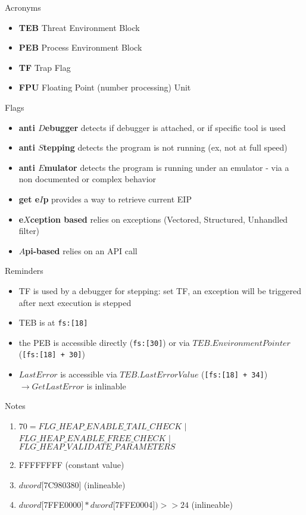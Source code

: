 \sig

\newpage
{\large Acronyms}
\begin{itemize}
\item {\bf TEB}
Threat Environment Block
\item {\bf PEB}
Process Environment Block
\item {\bf TF}
Trap Flag
\item {\bf FPU}
Floating Point (number processing) Unit
\end{itemize}

{\large Flags}
\begin{itemize}
\item {\bf anti $D$ebugger}
detects if debugger is attached, or if specific tool is used
\item {\bf anti $S$tepping}
detects the program is not running (ex, not at full speed)
\item {\bf anti $E$mulator}
detects the program is running under an emulator - via a non documented or complex behavior
\item {\bf get e$I$p}
provides a way to retrieve current EIP
\item {\bf e$X$ception based}
relies on exceptions (Vectored, Structured, Unhandled filter)
\item {\bf $A$pi-based}
relies on an API call
\end{itemize}


{\large Reminders}
\begin{itemize}
\item
TF is used by a debugger for stepping: set TF, an exception will be triggered after next execution is stepped
\item
TEB is at {\tt fs:[18]}
\item
the PEB is accessible directly ({\tt fs:[30]}) or via $TEB.EnvironmentPointer$ ({\tt [fs:[18] + 30]})
\item
$LastError$ is accessible via $TEB.LastErrorValue$ ({\tt [fs:[18] + 34]}) $\rightarrow GetLastError$ is inlinable
\end{itemize}

{\large Notes}
\begin{enumerate}
\item
$70 = ${\footnotesize $FLG\_HEAP\_ENABLE\_TAIL\_CHECK$} $|$ {\footnotesize $FLG\_HEAP\_ENABLE\_FREE\_CHECK$} $|$ {\footnotesize  $FLG\_HEAP\_VALIDATE\_PARAMETERS$}
\item
FFFFFFFF (constant value)
\item
$dword[$7C980380$]$ (inlineable)
\item
$dword [$7FFE0000$] * dword[$7FFE0004$]) >> 24$ (inlineable)
\end{enumerate}
\sig

